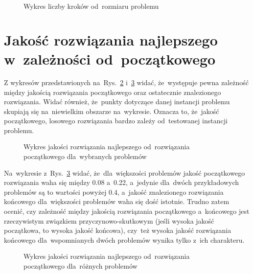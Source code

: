 \documentclass[a4paper,10pt]{article}
\begin{document}
\begin{figure}[!htpb]
\begin{center}

\caption{Wykres liczby kroków od~rozmiaru problemu}
\label{fig:stepssize}
\end{center}
\end{figure}

\section{Jakość rozwiązania najlepszego w~zależności od~początkowego}
Z wykresów przedstawionych na~Rys.~\ref{fig:initendquality} i~\ref{fig:initendqualityall} widać, że~występuje pewna zależność
między jakością rozwiązania początkowego oraz ostatecznie znalezionego rozwiązania. Widać również, że~punkty dotyczące
danej instancji problemu skupiają się na~niewielkim obszarze na~wykresie. Oznacza to, że~jakość początkowego, losowego
rozwiązania bardzo zależy od~testowanej instancji problemu.

\begin{figure}
\begin{center}

\caption{Wykres jakości rozwiązania najlepszego od~rozwiązania początkowego dla~wybranych problemów}
\label{fig:initendquality}
\end{center}
\end{figure}

Na~wykresie z~Rys.~\ref{fig:initendqualityall} widać, że~dla~większości
problemów jakość początkowego rozwiązania waha się między \num{0.08} a~\num{0.22}, a~jedynie dla~dwóch przykładowych problemów
są to wartości powyżej \num{0.4}, a~jakość znalezionego rozwiązania końcowego dla~większości problemów waha się dość istotnie.
Trudno zatem ocenić, czy zależność między jakością rozwiązania początkowego a~końcowego jest rzeczywistym związkiem przyczynowo-skutkowym
(jeśli wysoka jakość początkowa, to wysoka jakość końcowa), czy~też wysoka jakość rozwiązania końcowego dla~wspomnianych dwóch problemów
wynika tylko z~ich charakteru.

\begin{figure}[!htpb]
\begin{center}

\caption{Wykres jakości rozwiązania najlepszego od~rozwiązania początkowego dla~różnych problemów}
\label{fig:initendqualityall}
\end{center}
\end{figure}
\end{document}
